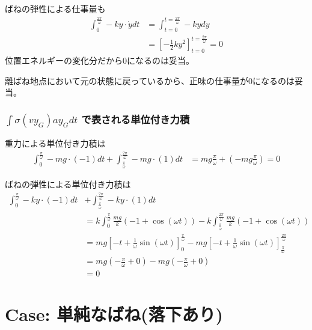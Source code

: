 \documentclass[a4paper,11pt]{jsarticle}
\begin{document}
ばねの弾性による仕事量も
\begin{align}
  \int_0^{\frac{2\pi}{\omega}} -ky \cdot\dot{y} dt
   & = \int_{t=0}^{t=\frac{2\pi}{\omega}} -kydy
  \\&= \left[-\frac{1}{2}ky^2\right]_{t=0}^{t=\frac{2\pi}{\omega}} = 0
\end{align}
位置エネルギーの変化分だから0になるのは妥当。

離ばね地点において元の状態に戻っているから、正味の仕事量が0になるのは妥当。

\subsubsection{$\int\sigma (vy_G)ay_G dt$ で表される単位付き力積}
重力による単位付き力積は
\begin{align}
  \int_0^{\frac{\pi}{\omega}} -mg\cdot(-1) dt + \int_{\frac{\pi}{\omega}}^{\frac{2\pi}{\omega}} -mg\cdot(1) dt
   & = mg\frac{\pi}{\omega} + \left(-mg\frac{\pi}{\omega}\right) = 0
\end{align}

ばねの弾性による単位付き力積は
\begin{align}
  \int_0^{\frac{\pi}{\omega}} -ky\cdot(-1) dt
   & + \int_{\frac{\pi}{\omega}}^{\frac{2\pi}{\omega}} -ky\cdot(1) dt
  \\ &= k \int_0^{\frac{\pi}{\omega}} \frac{mg}{k}\left(-1+\cos(\omega t)\right)
  - k \int_{\frac{\pi}{\omega}}^{\frac{2\pi}{\omega}} \frac{mg}{k}\left(-1+\cos(\omega t)\right)
  \\&= mg \left[-t+\frac{1}{\omega}\sin(\omega t)\right]_0^{\frac{\pi}{\omega}}
  - mg \left[-t+\frac{1}{\omega}\sin(\omega t)\right]_{\frac{\pi}{\omega}}^{\frac{2\pi}{\omega}}
  \\&= mg \left( -\frac{\pi}{\omega} + 0 \right)
  - mg\left( -\frac{\pi}{\omega} + 0 \right)
  \\ &= 0
\end{align}


\section{Case: 単純なばね(落下あり)}
\label{section:simple_string_h}
\end{document}
